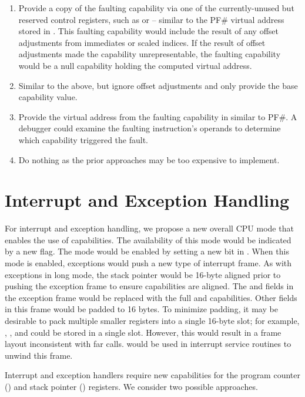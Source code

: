 \begin{enumerate}
\item Provide a copy of the faulting capability via one of the
  currently-unused but reserved control registers, such as \CRFIVE{}
  or \CRTWELVE{} -- similar to the PF\# virtual address stored in
  \CRTWO{}.  This faulting capability would include the result of any
  offset adjustments from immediates or scaled indices.  If the result
  of offset adjustments made the capability unrepresentable, the
  faulting capability would be a null capability holding the computed
  virtual address.
\item Similar to the above, but ignore offset adjustments and only
  provide the base capability value.
\item Provide the virtual address from the faulting capability in
  \CRTWO{} similar to PF\#.  A debugger could examine the faulting
  instruction's operands to determine which capability triggered the fault.
\item Do nothing as the prior approaches may be too expensive to
  implement.
\end{enumerate}

\section{Interrupt and Exception Handling}
\label{sec:x86:interrupt-exception}

For interrupt and exception handling, we propose a new overall CPU
mode that enables the use of capabilities.  The availability of this
mode would be indicated by a new  flag.  The mode
would be enabled by setting a new bit in \CRFOUR{}.  When this mode is
enabled, exceptions would push a new type of interrupt frame.  As with
exceptions in long mode, the stack pointer would be 16-byte aligned
prior to pushing the exception frame to ensure capabilities are
aligned.  The \RIP{} and \RSP{} fields in the exception frame would be
replaced with the full \CIP{} and \CSP{} capabilities.  Other fields
in this frame would be padded to 16 bytes.  To minimize padding, it
may be desirable to pack multiple smaller registers into a single
16-byte slot; for example, \SS{}, \CS{}, and \RFLAGS{} could be stored
in a single slot.  However, this would result in a frame layout
inconsistent with far calls.   would be used in
interrupt service routines to unwind this frame.

Interrupt and exception handlers require new capabilities for the
program counter (\CIP{}) and stack pointer (\CSP{}) registers.  We consider
two possible approaches.


